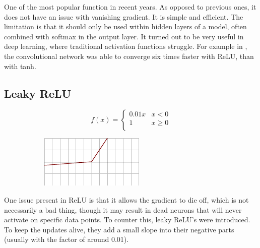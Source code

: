 \noindent
One of the most popular function in recent years. As opposed to previous ones, it does not have an issue with vanishing gradient. It is simple and efficient. The limitation is that it should only be used within hidden layers of a model, often combined with softmax in the output layer. It turned out to be very useful in deep learning, where traditional activation functions struggle. For example in \cite{relu_faster}, the convolutional network was able to converge six times faster with ReLU, than with tanh.

\subsection*{Leaky ReLU}

\begin{figure}[H]
\raggedright
\begin{subfigure}{.38\textwidth}
  \centering
  \[
f(x) = \begin{cases}
       0.01x & x < 0 \\
       1 & x \geq 0 \\
     \end{cases} \]  
\end{subfigure}%
\begin{subfigure}{.25\textwidth}
  \centering
  \includegraphics[width=\textwidth]{tex/images/activation/lrelu}
\end{subfigure}
\end{figure}

\noindent
One issue present in ReLU is that it allows the gradient to die off, which is not necessarily a bad thing, though it may result in dead neurons that will never activate on specific data points. To counter this, leaky ReLU's were introduced. To keep the updates alive, they add a small slope into their negative parts (usually with the factor of around 0.01).
   
